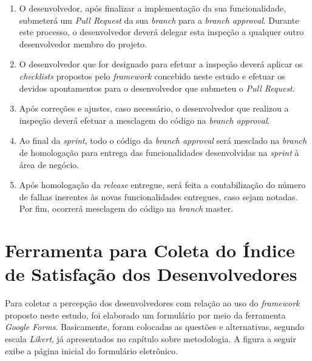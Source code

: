 \begin{enumerate}
	\item O desenvolvedor, após finalizar a implementação da sua funcionalidade, submeterá um \textit{Pull Request} da sua \textit{branch} para a \textit{branch approval}. Durante este processo, o desenvolvedor deverá delegar esta inspeção a qualquer outro desenvolvedor membro do projeto.

	\item O desenvolvedor que for designado para efetuar a inspeção deverá aplicar os \textit{checklists} propostos pelo \textit{framework} concebido neste estudo e efetuar os devidos apontamentos para o desenvolvedor que submeteu o \textit{Pull Request}.

	\item Após correções e ajustes, caso necessário, o desenvolvedor que realizou a inspeção deverá efetuar a mesclagem do código na \textit{branch approval}.

	\item Ao final da \textit{sprint}, todo o código da \textit{branch approval} será mesclado na \textit{branch} de homologação para entrega das funcionalidades desenvolvidas na \textit{sprint} à área de negócio.

	\item Após homologação da \textit{release} entregue, será feita a contabilização do número de falhas inerentes às novas funcionalidades entregues, caso sejam notadas. Por fim, ocorrerá mesclagem do código na \textit{branch} master.
\end{enumerate}

\section{Ferramenta para Coleta do Índice de Satisfação dos Desenvolvedores}

Para coletar a percepção dos desenvolvedores com relação ao uso do \textit{framework} proposto neste estudo, foi elaborado um formulário por meio da ferramenta \textit{Google Forms}. Basicamente, foram colocadas as questões e alternativas, segundo escala \textit{Likert}, já apresentados no capítulo sobre metodologia. A figura a seguir exibe a página inicial do formulário eletrônico.

